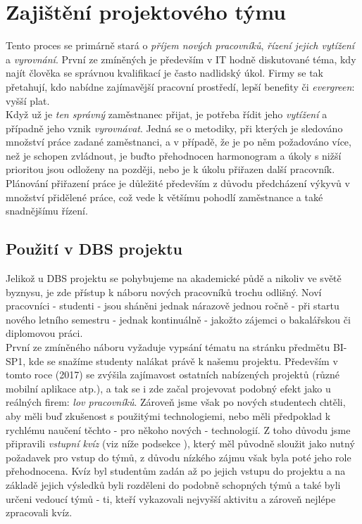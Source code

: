 
\section{Zajištění projektového týmu}

Tento proces se primárně stará o \emph{příjem nových pracovníků}, \emph{řízení jejich vytížení} a \emph{vyrovnání}. První ze zmíněných je především v IT hodně diskutované téma, kdy najít člověka se správnou kvalifikací je často nadlidský úkol. Firmy se tak přetahují, kdo nabídne zajímavější pracovní prostředí, lepší benefity či \emph{evergreen}: vyšší plat.\\
Když už je \emph{ten správný} zaměstnanec přijat, je potřeba řídit jeho \emph{vytížení} a případně jeho vznik \emph{vyrovnávat}. Jedná se o metodiky, při kterých je sledováno množství práce zadané zaměstnanci, a v případě, že je po něm požadováno více, než je schopen zvládnout, je buďto přehodnocen harmonogram a úkoly s nižší prioritou jsou odloženy na později, nebo je k úkolu přiřazen další pracovník.\\
Plánování přiřazení práce je důležité především z důvodu předcházení výkyvů v množství přidělené práce, což vede k většímu pohodlí zaměstnance a také snadnějšímu řízení.

\subsection{Použití v DBS projektu}
Jelikož u DBS projektu se pohybujeme na akademické půdě a nikoliv ve světě byznysu, je zde přístup k náboru nových pracovníků trochu odlišný. Noví pracovníci - studenti - jsou sháněni jednak nárazově jednou ročně - při startu nového letního semestru - jednak kontinuálně - jakožto zájemci o bakalářskou či diplomovou práci.\\
První ze zmíněného náboru vyžaduje vypsání tématu na stránku předmětu BI-SP1, kde se snažíme studenty nalákat právě k našemu projektu. Především v tomto roce (2017) se zvýšila zajímavost ostatních nabízených projektů (různé mobilní aplikace atp.), a tak se i zde začal projevovat podobný efekt jako u reálných firem: \emph{lov pracovníků}. Zároveň jsme však po nových studentech chtěli, aby měli buď zkušenost s použitými technologiemi, nebo měli předpoklad k rychlému naučení těchto - pro někoho nových - technologií. Z toho důvodu jsme připravili \emph{vstupní kvíz} (viz níže podsekce ), který měl původně sloužit jako nutný požadavek pro vstup do týmů, z důvodu nízkého zájmu však byla poté jeho role přehodnocena. Kvíz byl studentům zadán až po jejich vstupu do projektu a na základě jejich výsledků byli rozděleni do podobně schopných týmů a také byli určeni vedoucí týmů - ti, kteří vykazovali nejvyšší aktivitu a zároveň nejlépe zpracovali kvíz.

